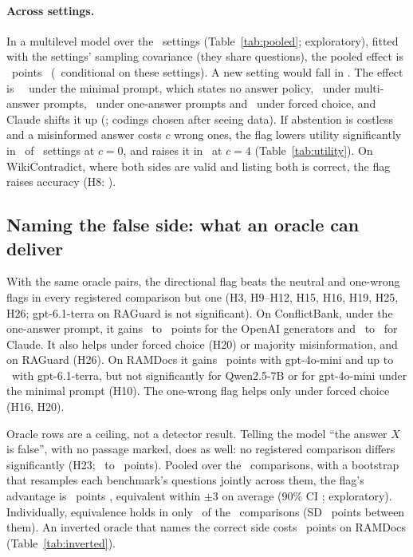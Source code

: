 \paragraph{Across settings.} In a multilevel model over the \neuMlK\ settings (Table~\ref{tab:pooled}; exploratory),
fitted with the settings' sampling covariance (they share questions), the pooled effect is \neuMlMu\ points
\neuMlCI\ (\neuMlCIDesign\ conditional on these settings). A new setting would fall in \neuMlPI. The effect is
\neuPolMinimal\ \neuPolMinimalCI\ under the minimal prompt, which states no answer policy, \neuPolMulti\ under
multi-answer prompts, \neuPolSingle\ under one-answer prompts and \neuPolForced\ under forced choice, and Claude
shifts it up (\neuMlAnthropic; codings chosen after seeing data). If abstention is costless and a misinformed answer
costs $c$ wrong ones, the flag lowers utility significantly in \nUtilSixNegZero\ of \nUtilSixSettings\ settings at
$c=0$, and raises it in \nUtilSixPosFour\ at $c=4$ (Table~\ref{tab:utility}). On WikiContradict, where both sides are valid and listing both is
correct, the flag raises accuracy (H8: \wikiOracleFlag).

\subsection{Naming the false side: what an oracle can deliver}
\label{sec:direction}
With the same oracle pairs, the directional flag beats the neutral and one-wrong flags in every registered comparison
but one (H3, H9--H12, H15, H16, H19, H25, H26; gpt-6.1-terra on RAGuard is not significant). On ConflictBank, under
the one-answer prompt, it gains \azSgTerraOracleFlagDirectionalConflict\ to \azSgLunaOracleFlagDirectionalConflict\
points for the OpenAI generators and \azSgSonnetOracleFlagDirectionalConflict\ to
\azSgHaikuOracleFlagDirectionalConflict\ for Claude. It also helps under forced choice (H20) or majority
misinformation, and on RAGuard (H26). On RAMDocs it gains \adOracleDirConf\ points with gpt-4o-mini and
up to \azRdTerraOracleFlagDirectionalConflict\ with gpt-6.1-terra, but not significantly for Qwen2.5-7B or for
gpt-4o-mini under the minimal prompt (H10). The one-wrong flag helps only under forced choice (H16, H20).

Oracle rows are a ceiling, not a detector result. Telling the model ``the answer $X$ is false'', with no passage
marked, does as well: no registered comparison differs significantly (H23; \keyDiffMin\ to \keyDiffMax\ points).
Pooled over the \PoolTwentyThreeK\ comparisons, with a bootstrap that resamples each benchmark's questions jointly
across them, the flag's advantage is \PoolTwentyThree\ points \PoolTwentyThreeCI, equivalent within $\pm$3 on average
(90\% CI \PoolTwentyThreeCINinety; exploratory). Individually, equivalence holds in only \hTwentyThreeEqN\ of
the \hTwentyThreeK\ comparisons (SD \hTwentyThreeTau\ points between them). An inverted oracle
that names the correct side costs \aadvDirConf\ points on RAMDocs (Table~\ref{tab:inverted}).

